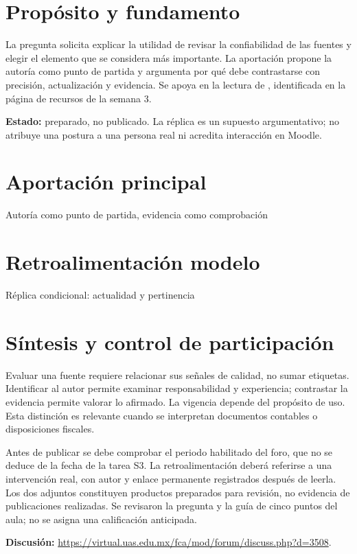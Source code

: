 


\section{Propósito y fundamento}
La pregunta solicita explicar la utilidad de revisar la confiabilidad de las fuentes y elegir el elemento que se considera más importante. La aportación propone la autoría como punto de partida y argumenta por qué debe contrastarse con precisión, actualización y evidencia. Se apoya en la lectura de \textcite{castillo2020}, identificada en la página de recursos de la semana 3.

\noindent\textbf{Estado:} preparado, no publicado. La réplica es un supuesto argumentativo; no atribuye una postura a una persona real ni acredita interacción en Moodle.

\section{Aportación principal}
\begin{forobox}{Autoría como punto de partida, evidencia como comprobación}

\end{forobox}

\section{Retroalimentación modelo}
\begin{forobox}{Réplica condicional: actualidad y pertinencia}

\end{forobox}

\section{Síntesis y control de participación}
Evaluar una fuente requiere relacionar sus señales de calidad, no sumar etiquetas. Identificar al autor permite examinar responsabilidad y experiencia; contrastar la evidencia permite valorar lo afirmado. La vigencia depende del propósito de uso. Esta distinción es relevante cuando se interpretan documentos contables o disposiciones fiscales.

Antes de publicar se debe comprobar el periodo habilitado del foro, que no se deduce de la fecha de la tarea S3. La retroalimentación deberá referirse a una intervención real, con autor y enlace permanente registrados después de leerla. Los dos adjuntos constituyen productos preparados para revisión, no evidencia de publicaciones realizadas. Se revisaron la pregunta y la guía de cinco puntos del aula; no se asigna una calificación anticipada.

\noindent\textbf{Discusión:} \url{https://virtual.uas.edu.mx/fca/mod/forum/discuss.php?d=3508}.
